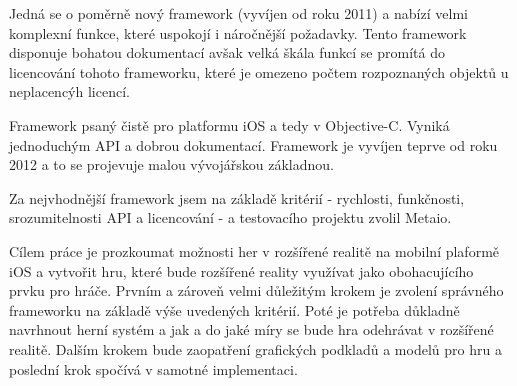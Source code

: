 \documentclass[oneside,12pt]{article}
\begin{document}
Jedná se o poměrně nový framework (vyvíjen od roku 2011) a nabízí velmi komplexní funkce, které uspokojí i náročnější požadavky. Tento framework disponuje bohatou dokumentací avšak velká škála funkcí se promítá do licencování tohoto frameworku, které je omezeno počtem rozpoznaných objektů u neplacencýh licencí.

Framework psaný čistě pro platformu iOS a tedy v Objective-C. Vyniká jednoduchým API a dobrou dokumentací. Framework je vyvíjen teprve od roku 2012 a to se projevuje malou vývojářskou základnou.

Za nejvhodnější framework jsem na základě kritérií - rychlosti, funkčnosti, srozumitelnosti API a licencování - a testovacího projektu zvolil Metaio.

Cílem práce je prozkoumat možnosti her v rozšířené realitě na mobilní plaformě iOS a vytvořit hru, které bude rozšířené reality využívat jako obohacujícího prvku pro hráče. Prvním a zároveň velmi důležitým krokem je zvolení správného frameworku na základě výše uvedených kritérií. Poté je potřeba důkladně navrhnout herní systém a jak a do jaké míry se bude hra odehrávat v rozšířené realitě. Dalším krokem bude zaopatření grafických podkladů a modelů pro hru a poslední krok spočívá v samotné implementaci.
\end{document}
